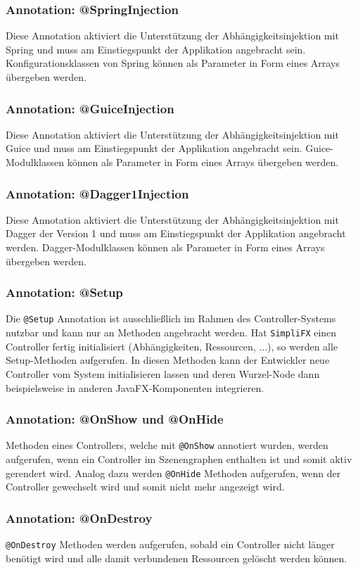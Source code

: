 \subsubsection{Annotation: @SpringInjection}
Diese Annotation aktiviert die Unterstützung der Abhängigkeitsinjektion mit Spring und muss am Einstiegspunkt der Applikation angebracht sein. Konfigurationsklassen von Spring können als Parameter in Form eines Arrays übergeben werden.
\subsubsection{Annotation: @GuiceInjection}
Diese Annotation aktiviert die Unterstützung der Abhängigkeitsinjektion mit Guice und muss am Einstiegspunkt der Applikation angebracht sein. Guice-Modulklassen können als Parameter in Form eines Arrays übergeben werden.
\subsubsection{Annotation: @Dagger1Injection}
Diese Annotation aktiviert die Unterstützung der Abhängigkeitsinjektion mit Dagger der Version 1 und muss am Einstiegspunkt der Applikation angebracht werden. Dagger-Modulklassen können als Parameter in Form eines Arrays übergeben werden.
\subsubsection{Annotation: @Setup}
Die \texttt{@Setup} Annotation ist ausschließlich im Rahmen des Controller-Systems nutzbar und kann nur an Methoden angebracht werden. Hat \texttt{SimpliFX} einen Controller fertig initialisiert (Abhängigkeiten, Ressourcen, ...), so werden alle Setup-Methoden aufgerufen. In diesen Methoden kann der Entwickler neue Controller vom System initialisieren lassen und deren Wurzel-Node dann beispielsweise in anderen JavaFX-Komponenten integrieren.
\subsubsection{Annotation: @OnShow und @OnHide}
Methoden eines Controllers, welche mit \texttt{@OnShow} annotiert wurden, werden aufgerufen, wenn ein Controller im Szenengraphen enthalten ist und somit aktiv gerendert wird. Analog dazu werden \texttt{@OnHide} Methoden aufgerufen, wenn der Controller gewechselt wird und somit nicht mehr angezeigt wird.
\subsubsection{Annotation: @OnDestroy}
\texttt{@OnDestroy} Methoden werden aufgerufen, sobald ein Controller nicht länger benötigt wird und alle damit verbundenen Ressourcen gelöscht werden können.
